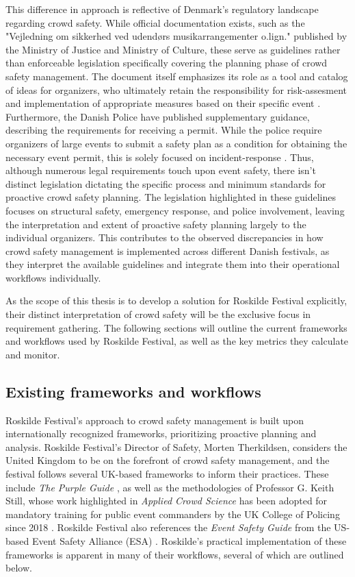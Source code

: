 This difference in approach is reflective of Denmark's regulatory landscape regarding crowd safety. While official documentation exists, such as the "Vejledning om sikkerhed ved udendørs musikarrangementer o.lign." published by the Ministry of Justice and Ministry of Culture, these serve as guidelines rather than enforceable legislation specifically covering the planning phase of crowd safety management. The document itself emphasizes its role as a tool and catalog of ideas for organizers, who ultimately retain the responsibility for risk-assesment and implementation of appropriate measures based on their specific event \cite{jm_safety}. Furthermore, the Danish Police have published supplementary guidance, describing the requirements for receiving a permit. While the police require organizers of large events to submit a safety plan as a condition for obtaining the necessary event permit, this is solely focused on incident-response \cite{police_safety}. Thus, although numerous legal requirements touch upon event safety, there isn't distinct legislation dictating the specific process and minimum standards for proactive crowd safety planning. The legislation highlighted in these guidelines focuses on structural safety, emergency response, and police involvement, leaving the interpretation and extent of proactive safety planning largely to the individual organizers. This contributes to the observed discrepancies in how crowd safety management is implemented across different Danish festivals, as they interpret the available guidelines and integrate them into their operational workflows individually.

As the scope of this thesis is to develop a solution for Roskilde Festival explicitly, their distinct interpretation of crowd safety will be the exclusive focus in requirement gathering. The following sections will outline the current frameworks and workflows used by Roskilde Festival, as well as the key metrics they calculate and monitor.


\subsection{Existing frameworks and workflows}

Roskilde Festival's approach to crowd safety management is built upon internationally recognized frameworks, prioritizing proactive planning and analysis. Roskilde Festival's Director of Safety, Morten Therkildsen, considers the United Kingdom to be on the forefront of crowd safety management, and the festival follows several UK-based frameworks to inform their practices. These include \textit{The Purple Guide} \cite{purple_guide}, as well as the methodologies of Professor G. Keith Still, whose work highlighted in \textit{Applied Crowd Science} has been adopted for mandatory training for public event commanders by the UK College of Policing since 2018 \cite{keith_still}. Roskilde Festival also references the \textit{Event Safety Guide} from the US-based Event Safety Alliance (ESA) \cite{es_guide}. Roskilde's practical implementation of these frameworks is apparent in many of their workflows, several of which are outlined below.

